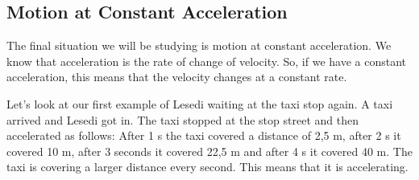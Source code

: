 \subsection{Motion at Constant Acceleration}
The final situation we will be studying is motion at constant acceleration. We know that acceleration is the rate of change of velocity. So, if we have a constant acceleration, this means that the velocity changes at a constant rate.

Let's look at our first example of Lesedi waiting at the taxi stop again. A taxi arrived and Lesedi got in. The taxi stopped at the stop street and then accelerated as follows: After 1 s the taxi covered a distance of 2,5 m, after 2 s it covered 10 m, after 3 seconds it covered 22,5 m and after 4 s it covered 40 m. The taxi is covering a larger distance every second. This means that it is accelerating.

